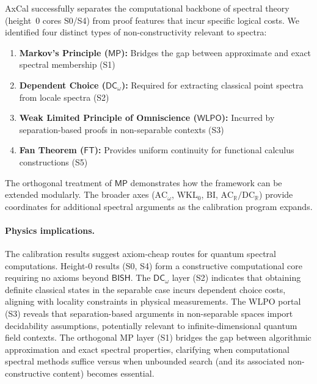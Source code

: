 \documentclass[11pt]{article}
\newcommand{\WLPO}{\mathsf{WLPO}}
\newcommand{\FT}{\mathsf{FT}}
\newcommand{\DCw}{\mathsf{DC}_{\omega}}
\newcommand{\MP}{\mathsf{MP}}
\theoremstyle{plain}
\theoremstyle{definition}
\theoremstyle{remark}
\newcommand{\BISH}{\mathsf{BISH}}
\newcommand{\ACw}{\mathrm{AC}_\omega}
\newcommand{\ACR}{\mathrm{AC}_{\mathbb{R}}}
\newcommand{\DCR}{\mathrm{DC}_{\mathbb{R}}}
\newcommand{\WKLz}{\mathrm{WKL}_0}
\newcommand{\BI}{\mathrm{BI}}
\begin{document}
AxCal successfully separates the computational backbone of spectral theory (height~0 cores S0/S4) from proof features that incur specific logical costs.
We identified four distinct types of non-constructivity relevant to spectra:
\begin{enumerate}
\item \textbf{Markov's Principle ($\MP$):} Bridges the gap between approximate and exact spectral membership (S1)
\item \textbf{Dependent Choice ($\DCw$):} Required for extracting classical point spectra from locale spectra (S2)
\item \textbf{Weak Limited Principle of Omniscience ($\WLPO$):} Incurred by separation-based proofs in non-separable contexts (S3)
\item \textbf{Fan Theorem ($\FT$):} Provides uniform continuity for functional calculus constructions (S5)
\end{enumerate}

The orthogonal treatment of $\MP$ demonstrates how the framework can be extended modularly. The broader axes ($\ACw$, $\WKLz$, $\BI$, $\ACR/\DCR$) provide coordinates for additional spectral arguments as the calibration program expands.

\paragraph{Physics implications.}
The calibration results suggest axiom-cheap routes for quantum spectral computations. Height-0 results (S0, S4) form a constructive computational core requiring no axioms beyond $\BISH$. The $\DCw$ layer (S2) indicates that obtaining definite classical states in the separable case incurs dependent choice costs, aligning with locality constraints in physical measurements. The WLPO portal (S3) reveals that separation-based arguments in non-separable spaces import decidability assumptions, potentially relevant to infinite-dimensional quantum field contexts. The orthogonal MP layer (S1) bridges the gap between algorithmic approximation and exact spectral properties, clarifying when computational spectral methods suffice versus when unbounded search (and its associated non-constructive content) becomes essential.

\bigskip
\end{document}
